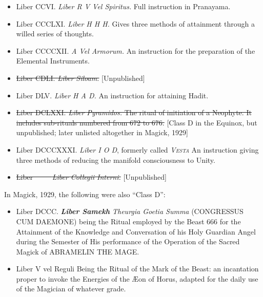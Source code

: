 \begin{itemize}
\item Liber CCVI. \textemdash{} \textit{Liber R V Vel Spiritus.} Full instruction in Pranayama.
\item Liber CCCLXI. \textemdash{} \textit{Liber H H H.} Gives three methods of attainment through a willed series of thoughts.
\item Liber CCCCXII. \textemdash{} \textit{A Vel Armorum.} An instruction for the preparation of the Elemental Instruments.
\item \sout{Liber CDLI. \textemdash{} \textit{Liber Siloam.}} [Unpublished]
\item Liber DLV. \textemdash{} \textit{Liber H A D.} An instruction for attaining Hadit.
\item \sout{Liber DCLXXI. \textemdash{} \textit{Liber Pyramidos.} The ritual of initiation of a Neophyte. It includes sub-rituals numbered from 672 to 676.} [Class D in the Equinox, but unpublished; later unlisted altogether in Magick, 1929]
\item Liber DCCCXXXI. \textemdash{} \textit{Liber I O D}, formerly called \textit{\textsc{Vesta}} An instruction giving three methods of reducing the manifold consciousness to Unity.
\item \sout{Liber \-\ \-\ \-\ \-\ \textemdash{} \textit{Liber Collegii Interni.}} [Unpublished]
\end{itemize}

In Magick, 1929, the following were also \enquote{Class D}:
\begin{itemize}
\item Liber DCCC. \textemdash{} \textit{\textbf{Liber Samekh} Theurgia Goetia Summa} (CONGRESSUS CUM DAEMONE) being the Ritual employed by the Beast 666 for the Attainment of the Knowledge and Conversation of his Holy Guardian Angel during the Semester of His performance of the Operation of the Sacred Magick of ABRAMELIN THE MAGE.
\item Liber V vel Reguli \textemdash{} Being the Ritual of the Mark of the Beast: an incantation proper to invoke the Energies of the \AE{}on of Horus, adapted for the daily use of the Magician of whatever grade.
\end{itemize}

